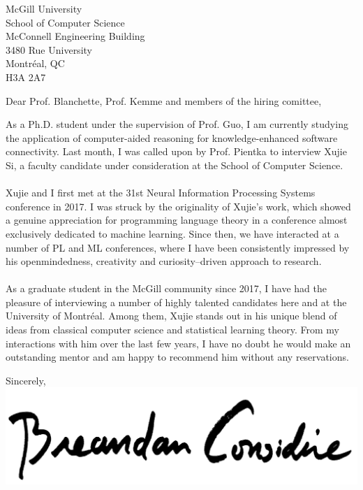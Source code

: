 \documentclass{letter}
\begin{document}
    \begin{letter}{McGill University\\School of Computer Science\\McConnell Engineering Building\\3480 Rue University\\Montr\'eal, QC\\H3A 2A7}
        \opening{Dear Prof. Blanchette, Prof. Kemme and members of the hiring comittee,}
        As a Ph.D. student under the supervision of Prof. Guo, I am currently studying the application of computer-aided reasoning for knowledge-enhanced software connectivity. Last month, I was called upon by Prof. Pientka to interview Xujie Si, a faculty candidate under consideration at the School of Computer Science.\\\\
        Xujie and I first met at the 31st Neural Information Processing Systems conference in 2017. I was struck by the originality of Xujie's work, which showed a genuine appreciation for programming language theory in a conference almost exclusively dedicated to machine learning. Since then, we have interacted at a number of PL and ML conferences, where I have been consistently impressed by his openmindedness, creativity and curiosity--driven approach to research.\\\\
        As a graduate student in the McGill community since 2017, I have had the pleasure of interviewing a number of highly talented candidates here and at the University of Montr\'eal. Among them, Xujie stands out in his unique blend of ideas from classical computer science and statistical learning theory. From my interactions with him over the last few years, I have no doubt he would make an outstanding mentor and am happy to recommend him without any reservations.\\
        \closing{Sincerely,\\
            \includegraphics[scale=0.06]{signature.png}\\
        }
    \end{letter}
\end{document}
